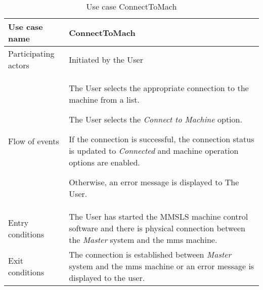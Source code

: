 \begin{table}
  \captionsetup{justification=raggedright, singlelinecheck=false}
  \caption{Use case ConnectToMach}
  \centering
  \begin{tabular}{p{}p{}}
    \hline
    Use case name & \textbf{ConnectToMach} \\ \hline
     Participating actors      & Initiated by the User \\ \hline
     Flow of events & \begin{enum-c}
     \item The User selects the appropriate connection to the machine from a list.
     \item The User selects the \emph{Connect to Machine} option.
     \item If the connection is successful, the connection status is updated to
       \emph{Connected} and machine operation options are enabled.
     \item Otherwise, an error message is displayed to The User.
     \end{enum-c}\\ \hline 
     Entry conditions       & The User has started the MMSLS machine control
     software and there is physical connection between the \emph{Master} system and
     the \gls{mms}  machine. \\ \hline 
      Exit conditions & The connection is established between \emph{Master} system and
      the \gls{mms} machine or an error message is displayed to the user.\\ \hline 
  \end{tabular}
\label{tab:us-con-to-mach}
\end{table}

